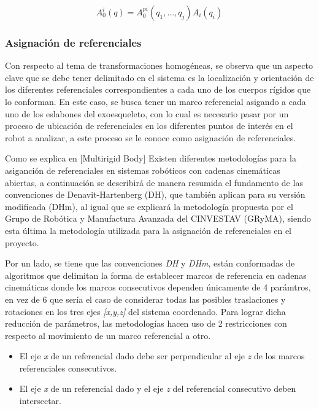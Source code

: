         \begin{equation*}
            A^i_0(q) =  A^{pi}_0(q_1,...,q_j)A_i(q_i)
        \end{equation*}

    \subsubsection{Asignación de referenciales}
        Con respecto al tema de transformaciones homogéneas, se observa que un 
        aspecto clave que se debe tener delimitado en el sistema es la localización 
        y orientación de los diferentes referenciales correspondientes a cada uno de 
        los cuerpos rígidos que lo conforman. En este caso, se busca tener un marco 
        referencial asigando a cada uno de los eslabones del exoesqueleto, con lo cual es 
        necesario pasar por un proceso de ubicación de referenciales en los diferentes 
        puntos de interés en el robot a analizar, a este proceso se le conoce como 
        asignación de referenciales.

        Como se explica en [Multirigid Body] Existen diferentes metodologías para la asiganción 
        de referenciales en sistemas robóticos con cadenas cinemáticas abiertas, a 
        continuación se describirá de manera resumida el fundamento de las convenciones de 
        Denavit-Hartenberg (DH), que también aplican para su versión modificada (DHm), 
        al igual que se explicará la metodología propuesta por el Grupo de Robótica y 
        Manufactura Avanzada del CINVESTAV (GRyMA), siendo esta última la metodología 
        utilizada para la asignación de referenciales en el proyecto.

        Por un lado, se tiene que las convenciones \emph{DH} y \emph{DHm}, están conformadas 
        de algoritmos que delimitan la forma de establecer marcos de referencia en 
        cadenas cinemáticas donde los marcos consecutivos dependen únicamente de 4 parámtros, 
        en vez de 6 que sería el caso de considerar todas las posibles traslaciones y rotaciones 
        en los tres ejes \emph{[x,y,z]} del sistema coordenado. Para lograr dicha reducción de 
        parámetros, las metodologías hacen uso de 2 restricciones con respecto al movimiento de 
        un marco referencial a otro.

        \begin{itemize}
            \item El eje \emph{x} de un referencial dado debe ser perpendicular al eje \emph{z} de los marcos referenciales consecutivos.
            \item El eje \emph{x} de un referencial dado y el eje \emph{z} del referencial consecutivo deben intersectar.
        \end{itemize}

